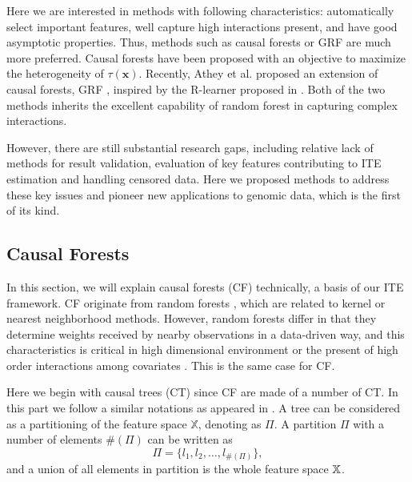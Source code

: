     
    Here we are interested in methods with following characteristics: automatically select important features, well capture high interactions present, and have good asymptotic properties. Thus, methods such as causal forests \cite{wager2018estimation} or GRF \cite{athey2019generalized} are much more preferred. Causal forests \cite{wager2018estimation} have been proposed with an objective to maximize the heterogeneity of $\tau(\mathbf{x})$. Recently, Athey et al. proposed an extension of causal forests, GRF \cite{athey2019generalized}, inspired by the R-learner proposed in \cite{nie2017quasi}. Both of the two methods \cite{wager2018estimation,athey2019generalized} inherits the excellent capability of random forest in capturing complex interactions. 
    
    However, there are still substantial research gaps, including relative lack of methods for result validation, evaluation of key features contributing to ITE estimation and handling censored data. Here we proposed methods to address these key issues and pioneer new applications to genomic data, which is the first of its kind.

  \subsection{Causal Forests}
  \label{sec:ite_cf}
    In this section, we will explain causal forests (CF) technically, a basis of our ITE framework. CF \cite{wager2018estimation} originate from random forests \cite{breiman2001random}, which are related to kernel  or nearest neighborhood methods. However, random forests differ in that they determine weights received by nearby observations in a data-driven way, and this characteristics is critical in high dimensional environment or the present of high order interactions among covariates \cite{wager2018estimation}. This is the same case for CF. 
    
    Here we begin with causal trees (CT) \cite{athey2016recursive} since CF are made of a number of CT. In this part we follow a similar notations as appeared in \cite{athey2016recursive}. A tree can be considered as a partitioning of the feature space $\mathbb{X}$, denoting as $\Pi$. A partition $\Pi$ with a number of elements $\#(\Pi)$ can be written as 
    \begin{equation*}
      \Pi = \{ l_1, l_2, \dots, l_{\#(\Pi)} \}, 
    \end{equation*}
    and a union of all elements in partition is the whole feature space $\mathbb{X}$.

